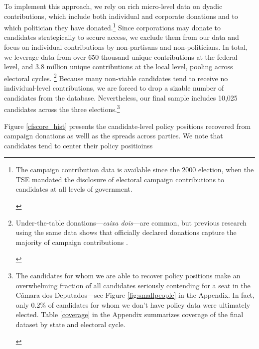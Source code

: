 \documentclass[12pt,english]{article}
\newcommand{\note}[1]{\footnote{ \begin{doublespace}#1  \end{doublespace}}}
\newcommand{\lyxdot}{.}
\numberwithin{equation}{section}
\theoremstyle{plain}
\theoremstyle{remark}
\theoremstyle{plain}
\begin{document}
To implement this approach, we rely on rich micro-level data on dyadic contributions, which include both individual and corporate donations and to which politician they have donated.\note{\normalsize The campaign contribution data is available since the 2000 election, when the TSE mandated the disclosure of electoral campaign contributions to candidates at all levels of government.%
}  Since corporations may donate to candidates strategically to secure access, we exclude them from our data and focus on individual contributions by non-partisans and non-politicians. In total, we leverage data from over 650 thousand unique contributions at the federal level, and 3.8 million unique contributions at the local level, pooling across electoral cycles.%
\note{\normalsize Under-the-table donations---\emph{caixa dois}---are common, but previous research using the same data shows that officially declared donations capture the majority of campaign contributions \cite{BoasHidalgoRichardson2014}.} Because many non-viable candidates tend to receive no individual-level contributions, we are forced to drop a sizable number of candidates from the database. Nevertheless, our final sample includes %
10,025 candidates across the three elections.\note{\normalsize The candidates for whom we are able to recover policy positions make an overwhelming fraction of all candidates seriously contending for a seat in the  C\^{a}mara dos Deputados---see Figure \ref{fig:smallpeople} in the Appendix. In fact, only 0.2\% of candidates for whom we don't have policy data were ultimately elected. Table \ref{coverage} in the Appendix summarizes coverage of the final dataset by state and electoral cycle.}

Figure \ref{cfscore_hist} presents the candidate-level policy positions recovered from campaign donations as welll as the spreads across parties. We note that candidates tend to center their policy positioinss 

\end{document}
